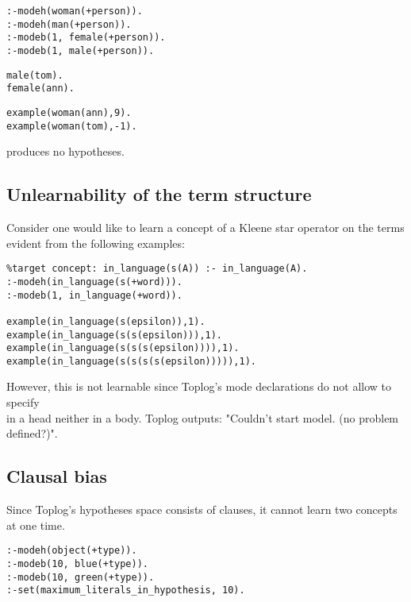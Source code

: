 \begin{minipage}[t]{.40\textwidth}
\begin{lstlisting}
:-modeh(woman(+person)).
:-modeh(man(+person)).
:-modeb(1, female(+person)).
:-modeb(1, male(+person)).
\end{lstlisting}
\end{minipage}
\begin{minipage}[t]{.20\textwidth}
\begin{lstlisting}
male(tom).
female(ann).
\end{lstlisting}
\end{minipage}
\begin{minipage}[t]{.20\textwidth}
\begin{lstlisting}
example(woman(ann),9).
example(woman(tom),-1).
\end{lstlisting}
\end{minipage}

produces no hypotheses.

\subsection{Unlearnability of the term structure}
Consider one would like to learn a concept of a Kleene star operator on the terms evident from the following examples:
\begin{lstlisting}
%target concept: in_language(s(A)) :- in_language(A).
:-modeh(in_language(s(+word))).
:-modeb(1, in_language(+word)).

example(in_language(s(epsilon)),1).
example(in_language(s(s(epsilon))),1).
example(in_language(s(s(s(epsilon)))),1).
example(in_language(s(s(s(s(epsilon))))),1).
\end{lstlisting}

However, this is not learnable since Toplog's mode declarations do not allow to specify\\
 in a head neither in a body. Toplog outputs:
"Couldn't start model. (no problem defined?)".

\subsection{Clausal bias}
Since Toplog's hypotheses space consists of clauses, it cannot learn two concepts at one time.

\begin{lstlisting}
:-modeh(object(+type)).
:-modeb(10, blue(+type)).
:-modeb(10, green(+type)).
:-set(maximum_literals_in_hypothesis, 10).
\end{lstlisting}

